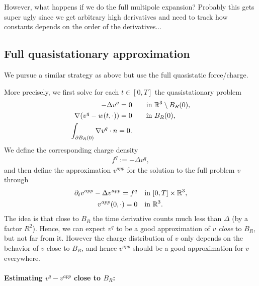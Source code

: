 \documentclass[abstracton, paper=a4, fontsize=11pt,DIV=12,bibliography=totoc]{scrartcl}
\begin{document}
However, what happens if we do the full multipole expansion? Probably this gets super ugly since we get arbitrary high derivatives and need to track how constants depends on the order of the derivatives...

\subsection{Full quasistationary approximation}

We pursue a similar strategy as above but use the full quasistatic force/charge.

More precisely, we first solve for each $t \in [0,T]$ the quasistationary problem
\begin{align}
   -\Delta v^{q}  = 0 &\qquad  \text{in }  \mathbb{R}^3 \setminus B_R(0), \\
    \nabla (v^{q} - w(t,\cdot)) = 0   & \qquad  \text{in }   B_R(0), \\
    \int_{\partial B_R(0)}  \nabla v^{q} \cdot n = 0.
\end{align}
We define the corresponding charge density
\begin{align}
    f^q := - \Delta v^q,
\end{align}
and then define the approximation $ v^{app}$ for the solution to the full problem $v$ through
\begin{align}
   \partial_t  v^{app} - \Delta v^{app} = f^q &\quad \text{in } [0,T] \times \mathbb{R}^3, \\
   v^{app}(0,\cdot) = 0 & \quad \text{in } \mathbb{R}^3.
\end{align}
The idea is that close to $B_R$ the time derivative counts much less than $\Delta$ (by a factor $R^2$). Hence, we can expect $v^q$ to be a good approximation of $v$ \emph{close} to $B_R$, but not far from it. 
However the charge distribution of $v$ only depends on the behavior of $v$ close to $B_R$, and hence $v^{app}$ should be a good approximation for $v$ everywhere.

\paragraph{Estimating $v^q - v^{app}$ close to $B_R$:}
\end{document}
